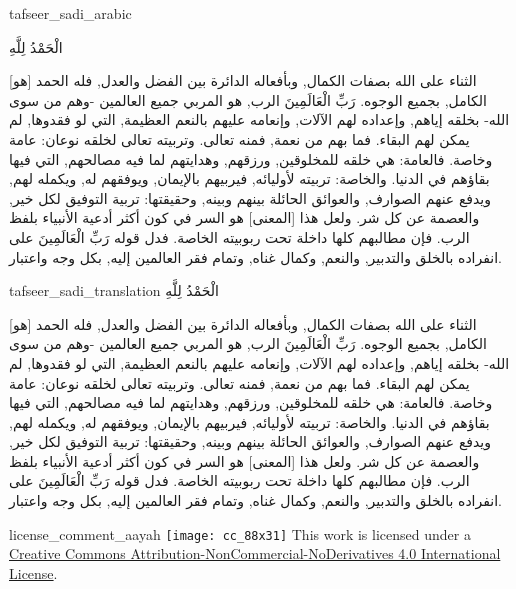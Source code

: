 \begin{taggedblock}{tafseer_sadi_arabic}
\begin{Arabic}
{ الْحَمْدُ لِلَّهِ }

[هو]
الثناء على الله بصفات الكمال, وبأفعاله الدائرة بين الفضل والعدل, فله الحمد الكامل, بجميع الوجوه.
{ رَبِّ الْعَالَمِينَ }
الرب, هو المربي جميع العالمين -وهم من سوى الله- بخلقه إياهم, وإعداده لهم الآلات, وإنعامه عليهم بالنعم العظيمة, التي لو فقدوها, لم يمكن لهم البقاء. فما بهم من نعمة, فمنه تعالى. وتربيته تعالى لخلقه نوعان: عامة وخاصة. فالعامة: هي خلقه للمخلوقين, ورزقهم, وهدايتهم لما فيه مصالحهم, التي فيها بقاؤهم في الدنيا. والخاصة: تربيته لأوليائه, فيربيهم بالإيمان, ويوفقهم له, ويكمله لهم, ويدفع عنهم الصوارف, والعوائق الحائلة بينهم وبينه, وحقيقتها: تربية التوفيق لكل خير, والعصمة عن كل شر. ولعل هذا
[المعنى]
هو السر في كون أكثر أدعية الأنبياء بلفظ الرب. فإن مطالبهم كلها داخلة تحت ربوبيته الخاصة. فدل قوله
{ رَبِّ الْعَالَمِينَ }
على انفراده بالخلق والتدبير, والنعم, وكمال غناه, وتمام فقر العالمين إليه, بكل وجه واعتبار.
\end{Arabic}
\end{taggedblock}
\begin{taggedblock}{tafseer_sadi_translation}
{ الْحَمْدُ لِلَّهِ }

[هو]
الثناء على الله بصفات الكمال, وبأفعاله الدائرة بين الفضل والعدل, فله الحمد الكامل, بجميع الوجوه.
{ رَبِّ الْعَالَمِينَ }
الرب, هو المربي جميع العالمين -وهم من سوى الله- بخلقه إياهم, وإعداده لهم الآلات, وإنعامه عليهم بالنعم العظيمة, التي لو فقدوها, لم يمكن لهم البقاء. فما بهم من نعمة, فمنه تعالى. وتربيته تعالى لخلقه نوعان: عامة وخاصة. فالعامة: هي خلقه للمخلوقين, ورزقهم, وهدايتهم لما فيه مصالحهم, التي فيها بقاؤهم في الدنيا. والخاصة: تربيته لأوليائه, فيربيهم بالإيمان, ويوفقهم له, ويكمله لهم, ويدفع عنهم الصوارف, والعوائق الحائلة بينهم وبينه, وحقيقتها: تربية التوفيق لكل خير, والعصمة عن كل شر. ولعل هذا
[المعنى]
هو السر في كون أكثر أدعية الأنبياء بلفظ الرب. فإن مطالبهم كلها داخلة تحت ربوبيته الخاصة. فدل قوله
{ رَبِّ الْعَالَمِينَ }
على انفراده بالخلق والتدبير, والنعم, وكمال غناه, وتمام فقر العالمين إليه, بكل وجه واعتبار.
\end{taggedblock}
\begin{taggedblock}{license_comment_aayah}
\texttt{[image: cc\_88x31]}
This work is licensed under a 
\href{http://creativecommons.org/licenses/by-nc-nd/4.0/}{Creative Commons Attribution-NonCommercial-NoDerivatives 4.0 International License}.
\end{taggedblock}
\begin{comment}
Please use the following for footnotes:- Sample\footnoteQ{Text of Qur'an footnote goes here.}.
Sample\footnoteT{Text of Tafseer footnote goes here.}.
\end{comment}